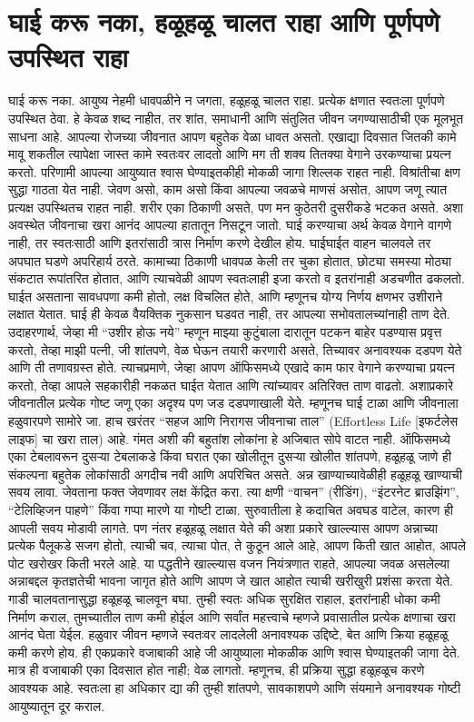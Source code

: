  \chapter{घाई करू नका, हळूहळू चालत राहा आणि पूर्णपणे उपस्थित राहा}
घाई करू नका. आयुष्य नेहमी धावपळीने न जगता, हळूहळू चालत राहा. प्रत्येक क्षणात स्वतःला पूर्णपणे उपस्थित ठेवा. हे केवळ शब्द नाहीत, तर शांत, समाधानी आणि संतुलित जीवन जगण्यासाठीची एक मूलभूत साधना आहे.
आपल्या रोजच्या जीवनात आपण बहुतेक वेळा धावत असतो. एखाद्या दिवसात जितकी कामे मावू शकतील त्यापेक्षा जास्त कामे स्वतःवर लादतो आणि मग ती शक्य तितक्या वेगाने उरकण्याचा प्रयत्न करतो. परिणामी आपल्या आयुष्यात श्वास घेण्याइतकीही मोकळी जागा शिल्लक राहत नाही. विश्रांतीचा क्षण सुद्धा गाठता येत नाही. जेवण असो, काम असो किंवा आपल्या जवळचे माणसं असोत, आपण जणू त्यात प्रत्यक्ष उपस्थितच राहत नाही. शरीर एका ठिकाणी असते, पण मन कुठेतरी दुसरीकडे भटकत असते. अशा अवस्थेत जीवनाचा खरा आनंद आपल्या हातातून निसटून जातो.
घाई करण्याचा अर्थ केवळ वेगाने वागणे नाही, तर स्वतःसाठी आणि इतरांसाठी त्रास निर्माण करणे देखील होय. घाईघाईत वाहन चालवले तर अपघात घडणे अपरिहार्य ठरते. कामाच्या ठिकाणी धावपळ केली तर चुका होतात, छोट्या समस्या मोठ्या संकटात रूपांतरित होतात, आणि त्याचवेळी आपण स्वतःलाही इजा करतो व इतरांनाही अडचणीत ढकलतो. घाईत असताना सावधपणा कमी होतो, लक्ष विचलित होते, आणि म्हणूनच योग्य निर्णय क्षणभर उशीराने लक्षात येतात.
घाई ही केवळ वैयक्तिक नुकसान घडवत नाही, तर आपल्या सभोवतालच्यांनाही ताण देते. उदाहरणार्थ, जेव्हा मी “उशीर होऊ नये” म्हणून माझ्या कुटुंबाला दारातून पटकन बाहेर पडण्यास प्रवृत्त करतो, तेव्हा माझी पत्नी, जी शांतपणे, वेळ घेऊन तयारी करणारी असते, तिच्यावर अनावश्यक दडपण येते आणि ती तणावग्रस्त होते. त्याचप्रमाणे, जेव्हा आपण ऑफिसमध्ये एखादे काम फार वेगाने करण्याचा प्रयत्न करतो, तेव्हा आपले सहकारीही नकळत घाईत येतात आणि त्यांच्यावर अतिरिक्त ताण वाढतो. अशाप्रकारे जीवनातील प्रत्येक गोष्ट जणू एका अदृश्य पण जड दडपणाखाली येते.
म्हणूनच घाई टाळा आणि जीवनाला हळुवारपणे सामोरे जा. हाच खरंतर “सहज आणि निरागस जीवनाचा ताल” (Effortless Life [इफर्टलेस लाइफ] चा खरा ताल) आहे. गंमत अशी की बहुतांश लोकांना हे अजिबात सोपे वाटत नाही. ऑफिसमध्ये एका टेबलावरून दुसऱ्या टेबलाकडे किंवा घरात एका खोलीतून दुसऱ्या खोलीत शांतपणे, हळूहळू जाणे ही संकल्पना बहुतेक लोकांसाठी अगदीच नवी आणि अपरिचित असते.
अन्न खाण्याच्यावेळीही हळूहळू खाण्याची सवय लावा. जेवताना फक्त जेवणावर लक्ष केंद्रित करा. त्या क्षणी “वाचन” (रीडिंग), “इंटरनेट ब्राउझिंग”, “टेलिव्हिजन पाहणे” किंवा गप्पा मारणे या गोष्टी टाळा. सुरुवातीला हे कदाचित अवघड वाटेल, कारण ही आपली सवय मोडावी लागते. पण नंतर हळूहळू लक्षात येते की अशा प्रकारे खाल्ल्यास आपण अन्नाच्या प्रत्येक पैलूकडे सजग होतो, त्याची चव, त्याचा पोत, ते कुठून आले आहे, आपण किती खात आहोत, आपले पोट खरोखर किती भरले आहे. या पद्धतीने खाल्ल्यास वजन नियंत्रणात राहते, आपल्या जवळ असलेल्या अन्नाबद्दल कृतज्ञतेची भावना जागृत होते आणि आपण जे खात आहोत त्याची खरीखुरी प्रशंसा करता येते.
गाडी चालवतानासुद्धा हळूहळू चालवून बघा. तुम्ही स्वतः अधिक सुरक्षित राहाल, इतरांनाही धोका कमी निर्माण कराल, तुमच्यातील ताण कमी होईल आणि सर्वांत महत्त्वाचे म्हणजे प्रवासातील प्रत्येक क्षणाचा खरा आनंद घेता येईल.
हळुवार जीवन म्हणजे स्वतःवर लादलेली अनावश्यक उद्दिष्टे, बेत आणि क्रिया हळूहळू कमी करणे होय. ही एकप्रकारे वजाबाकी आहे जी आयुष्याला मोकळीक आणि श्वास घेण्याइतकी जागा देते. मात्र ही वजाबाकी एका दिवसात होत नाही; वेळ लागतो. म्हणूनच, ही प्रक्रिया सुद्धा हळूहळूच करणे आवश्यक आहे. स्वतःला हा अधिकार द्या की तुम्ही शांतपणे, सावकाशपणे आणि संयमाने अनावश्यक गोष्टी आयुष्यातून दूर कराल.

